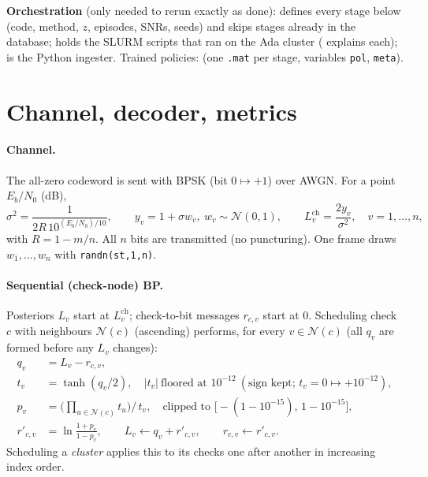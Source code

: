 \documentclass[10pt,a4paper]{article}
\newcommand{\Lch}{L^{\mathrm{ch}}}
\begin{document}
\textbf{Orchestration} (only needed to rerun exactly as done): \href{https://github.com/houleux/Decoder/blob/620ae0cc7a28c18792826c7daaab86634b8d3ca6/matlab_bridge/sched_driver.py}{\texttt{}} defines every stage below (code, method, $z$, episodes, SNRs, seeds) and skips stages already in the database; \href{https://github.com/houleux/Decoder/tree/620ae0cc7a28c18792826c7daaab86634b8d3ca6/matlab_bridge/ada_jobs}{\texttt{}} holds the SLURM scripts that ran on the Ada cluster (\href{https://github.com/houleux/Decoder/blob/620ae0cc7a28c18792826c7daaab86634b8d3ca6/matlab_bridge/ada_jobs/README.md}{\texttt{}} explains each); \href{https://github.com/houleux/Decoder/blob/620ae0cc7a28c18792826c7daaab86634b8d3ca6/matlab_bridge/ingest.py}{\texttt{}} is the Python ingester. Trained policies: \href{https://github.com/houleux/Decoder/tree/620ae0cc7a28c18792826c7daaab86634b8d3ca6/external_ref/ldpc_rl/checkpoints/sched}{\texttt{}} (one \texttt{.mat} per stage, variables \texttt{pol}, \texttt{meta}).

\section{Channel, decoder, metrics}
\paragraph{Channel.} The all-zero codeword is sent with BPSK (bit $0\mapsto +1$) over AWGN. For a point $E_b/N_0$ (dB),
\[ \sigma^2=\frac{1}{2R\,10^{(E_b/N_0)/10}},\qquad y_v=1+\sigma w_v,\ w_v\sim\mathcal N(0,1),\qquad \Lch_v=\frac{2y_v}{\sigma^2},\quad v=1,\dots,n, \]
with $R=1-m/n$. All $n$ bits are transmitted (no puncturing). One frame draws $w_1,\dots,w_n$ with \texttt{randn(st,1,n)}.

\paragraph{Sequential (check-node) BP.} Posteriors $L_v$ start at $\Lch_v$; check-to-bit messages $r_{c,v}$ start at 0.
Scheduling check $c$ with neighbours $\mathcal N(c)$ (ascending) performs, for every $v\in\mathcal N(c)$ (all $q_v$ are formed before any $L_v$ changes):
\begin{align*}
q_v&=L_v-r_{c,v},\\
t_v&=\tanh(q_v/2),\quad |t_v|\ \text{floored at }10^{-12}\ (\text{sign kept; }t_v=0\mapsto+10^{-12}),\\
p_v&=\Big(\textstyle\prod_{u\in\mathcal N(c)}t_u\Big)\big/\,t_v,\quad\text{clipped to }\big[-(1-10^{-15}),\,1-10^{-15}\big],\\
r'_{c,v}&=\ln\frac{1+p_v}{1-p_v},\qquad L_v\leftarrow q_v+r'_{c,v},\qquad r_{c,v}\leftarrow r'_{c,v}.
\end{align*}
Scheduling a \emph{cluster} applies this to its checks one after another in increasing index order.
\end{document}
